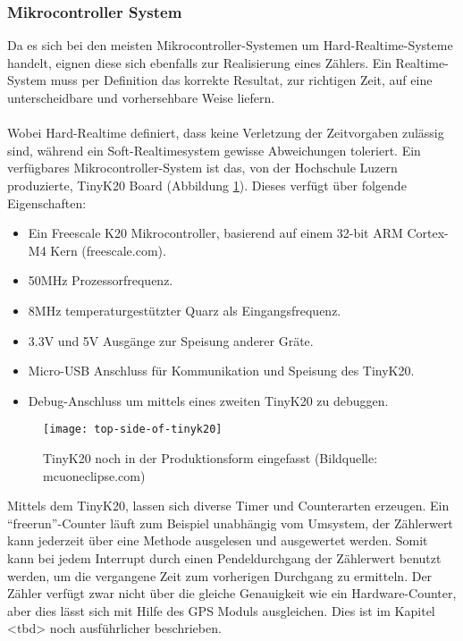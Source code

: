 	\subsubsection{Mikrocontroller System}
   		Da es sich bei den meisten Mikrocontroller-Systemen um Hard-Realtime-Systeme handelt, eignen diese sich ebenfalls zur Realisierung eines Zählers. Ein Realtime-System muss per Definition das korrekte Resultat, zur richtigen Zeit, auf eine unterscheidbare und vorhersehbare Weise liefern.\\
           \\
		Wobei Hard-Realtime definiert, dass keine Verletzung der Zeitvorgaben zulässig sind, während ein Soft-Realtimesystem gewisse Abweichungen toleriert. Ein verfügbares Mikrocontroller-System ist das, von der Hochschule Luzern produzierte, TinyK20 Board (Abbildung \ref{fig:TinyK20}). Dieses verfügt über folgende Eigenschaften:
		\begin{itemize}
			\item Ein Freescale K20 Mikrocontroller, basierend auf einem  32-bit ARM Cortex-M4 Kern (freescale.com).
			\item 50MHz Prozessorfrequenz.
			\item 8MHz temperaturgestützter Quarz als Eingangsfrequenz.
			\item 3.3V und 5V Ausgänge zur Speisung anderer Gräte.
			\item Micro-USB Anschluss für Kommunikation und Speisung des TinyK20.
			\item Debug-Anschluss um mittels eines zweiten TinyK20 zu debuggen.
		\end{itemize}
		\begin{figure}[H]
        	\centering
        	\texttt{[image: top-side-of-tinyk20]}
        	\caption{TinyK20 noch in der Produktionsform eingefasst (Bildquelle: mcuoneclipse.com)}
        	\label{fig:TinyK20}
    	\end{figure}
    	Mittels dem TinyK20, lassen sich diverse Timer und Counterarten erzeugen. Ein ``freerun''-Counter läuft zum Beispiel unabhängig vom Umsystem, der Zählerwert kann jederzeit über eine Methode ausgelesen und ausgewertet werden. Somit kann bei jedem Interrupt durch einen Pendeldurchgang der Zählerwert benutzt werden, um die vergangene Zeit zum vorherigen Durchgang zu ermitteln. Der Zähler verfügt zwar nicht über die gleiche Genauigkeit wie ein Hardware-Counter, aber dies lässt sich mit Hilfe des GPS Moduls ausgleichen. Dies ist im Kapitel <tbd> noch ausführlicher beschrieben.\\
